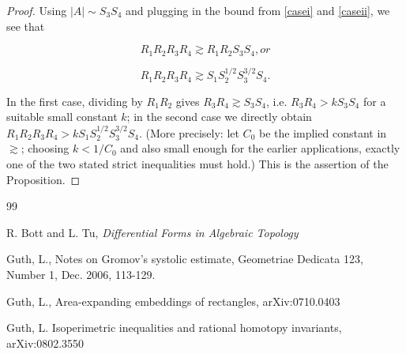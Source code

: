 \documentclass{amsart}
\newtheorem*{theorem 1}{Theorem 1}
\newtheorem*{theorem 2}{Theorem 2}
\newtheorem*{theorem 3}{Theorem 3}
\numberwithin{equation}{section}
\begin{document}
\begin{proof}
Using $|A| \sim S_3 S_4$ and plugging in the bound from \eqref{casei} and \eqref{caseii},  we see that

$$ R_1 R_2 R_3 R_4 \gtrsim R_1 R_2 S_3 S_4,  or $$

$$ R_1 R_2 R_3 R_4 \gtrsim S_1 S_2^{1/2} S_3^{3/2} S_4. $$

In the first case, dividing by $R_1 R_2$ gives $R_3 R_4 \gtrsim S_3
S_4$, i.e. $R_3 R_4 > k S_3 S_4$ for a suitable small constant $k$;
in the second case we directly obtain $R_1 R_2 R_3 R_4 > k S_1
S_2^{1/2} S_3^{3/2} S_4$.  (More precisely: let $C_0$ be the
implied constant in $\gtrsim$; choosing $k < 1/C_0$ and also small
enough for the earlier applications, exactly one of the two stated
strict inequalities must hold.)  This is the assertion of the
Proposition.
\end{proof}




\begin{thebibliography}{99}

 R. Bott and L. Tu,  {\it Differential Forms in Algebraic Topology}

 Guth, L., Notes on Gromov's systolic estimate,
Geometriae Dedicata 123, Number 1, Dec. 2006, 113-129.

 Guth, L., Area-expanding embeddings of rectangles, arXiv:0710.0403 

 Guth, L.  Isoperimetric inequalities and rational homotopy invariants, arXiv:0802.3550 


\end{thebibliography}
\end{document}
